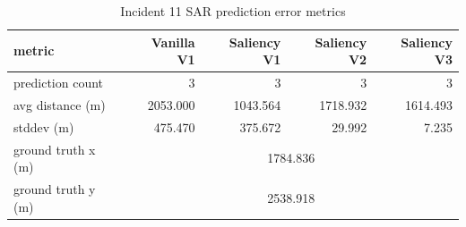 \begin{table}[ht]
\centering
\caption{Incident 11 SAR prediction error metrics}
\label{tab:sar-incident-11}
\begin{tabular}{lrrrr}
\hline
metric & Vanilla V1 & Saliency V1 & Saliency V2 & Saliency V3 \\
\hline
prediction count & 3 & 3 & 3 & 3 \\
avg distance (m) & 2053.000 & 1043.564 & 1718.932 & 1614.493 \\
stddev (m) & 475.470 & 375.672 & 29.992 & 7.235 \\
ground truth x (m) & \multicolumn{4}{c}{1784.836} \\
ground truth y (m) & \multicolumn{4}{c}{2538.918} \\
\hline
\end{tabular}
\end{table}
